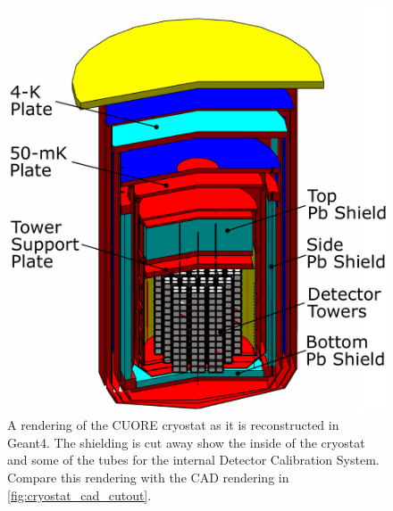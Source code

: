\begin{figure}[htbp]
    \centering
    \includegraphics[height=0.6\paperheight]{Figures/CUORE_cryostat_labelled.pdf}
    \caption[A rendering of the CUORE crysotat as it is reconstructed in Geant4.]
    {A rendering of the CUORE cryostat as it is reconstructed in Geant4.
    The shielding is cut away show the inside of the cryostat and some of the tubes for the internal Detector Calibration System.
    Compare this rendering with the CAD rendering in \autoref{fig:cryostat_cad_cutout}.}
    \label{fig:CUORE_cyrostat_MC}
\end{figure}

